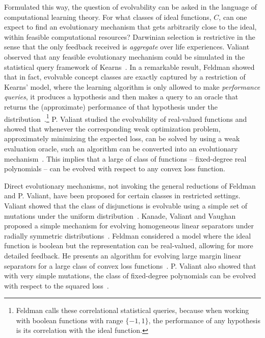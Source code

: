 \documentclass[11pt]{article}
\begin{document}
Formulated this way, the question of evolvability can be asked in the language
of computational learning theory. For what classes of ideal functions, $C$, can
one expect to find an evolutionary mechanism that gets arbitrarily close to the
ideal, within feasible computational resources? Darwinian selection is
restrictive in the sense that the only feedback received is {\em aggregate} over life
experiences. Valiant observed that any feasible evolutionary mechanism could be
simulated in the statistical query framework of Kearns~\cite{Kearns:1998}. In a
remarkable result, Feldman showed that in fact, evolvable concept classes are
exactly captured by a restriction of Kearns' model, where the learning
algorithm is only allowed to make \emph{performance queries}, \ie it produces a
hypothesis and then makes a query to an oracle that returns the (approximate)
performance of that hypothesis under the
distribution~\cite{Feldman:2008-evolvability}.\footnote{Feldman calls these
correlational statistical queries, because when working with boolean
functions with range $\{-1, 1\}$, the performance of any hypothesis is its
correlation with the ideal function.} P.  Valiant studied the evolvability of
real-valued functions and showed that whenever the corresponding weak
optimization problem, \ie approximately minimizing the expected loss, can be
solved by using a weak evaluation oracle, such an algorithm can be converted
into an evolutionary mechanism~\cite{Valiant:2012-real}. This implies that a
large of class of functions -- fixed-degree real polynomials -- can be evolved
with respect to any convex loss function.

Direct evolutionary mechanisms, not invoking the general reductions of Feldman
and P. Valiant, have been proposed for certain classes in restricted settings.
Valiant showed that the class of disjunctions is evolvable using a simple set of
mutations under the uniform distribution~\cite{Valiant:2009-evolvability}.
Kanade, Valiant and Vaughan proposed a simple mechanism for evolving homogeneous
linear separators under radially symmetric distributions~\cite{KVV:2010-drift}.
Feldman considered a model where the ideal function is boolean but the
representation can be real-valued, allowing for more detailed feedback. He
presents an algorithm for evolving large margin linear separators for a large
class of convex loss functions~\cite{Feldman:2011-LTF}. P. Valiant also showed
that with very simple mutations, the class of fixed-degree polynomials can be
evolved with respect to the squared loss~\cite{Valiant:2012-real}.
\end{document}
